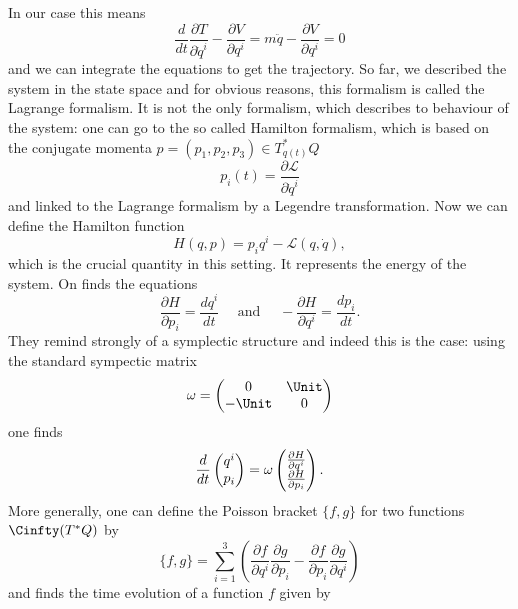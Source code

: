 In our case this means
\begin{equation*}
	\frac{d}{dt} 
	\frac{\partial T}{\partial \dot q^i}
	-
	\frac{\partial V}{\partial q^i}
	=
	m \ddot q
	-
	\frac{\partial V}{\partial q^i}
	=
	0
\end{equation*}
and we can integrate the equations to get the trajectory. So far, we described 
the system in the state space and for obvious reasons, this formalism is called 
the Lagrange formalism. It is not the only formalism, which describes to 
behaviour of the system: one can go to the so called Hamilton formalism, which 
is based on the conjugate momenta $p = (p_1, p_2, p_3) \in T_{q(t)}^*Q$
\begin{equation*}
	p_i(t)
	=
	\frac{\partial \mathcal{L}}{\partial \dot q^i}
\end{equation*}
and linked to the Lagrange formalism by a Legendre transformation. Now we can 
define the Hamilton function
\begin{equation*}
	H(q, p)
	=
	p_i q^i
	-
	\mathcal{L}(q, \dot q),
\end{equation*} 
which is the crucial quantity in this setting. It represents the energy of the 
system. On finds the equations
\begin{equation*}
	\frac{\partial H}{\partial p_i}
	=
	\frac{d q^i}{dt}
	\quad \text{ and } \quad
	- \frac{\partial H}{\partial q^i}
	=
	\frac{d p_i}{dt}.
\end{equation*}
They remind strongly of a symplectic structure and indeed this is the case: 
using the standard sympectic matrix
\begin{equation*}
	\omega
	=
	\begin{pmatrix}
		0 & \Unit
		\\
		- \Unit & 0
	\end{pmatrix}
\end{equation*}
one finds
\begin{equation*}
	\frac{d}{dt} \begin{pmatrix} q^i \\ p_i \end{pmatrix}
	=
	\omega
	\begin{pmatrix} \frac{\partial H}{\partial q^i} \\ \frac{\partial H}{\partial p_i} \end{pmatrix}.
\end{equation*}
More generally, one can define the Poisson bracket $\{f, g\}$ for two functions 
$\Cinfty(T^*Q)$ by
\begin{equation*}
	\{f, g\}
	=
	\sum\limits_{i=1}^3
	\left(
		\frac{\partial f}{\partial q^i}
		\frac{\partial g}{\partial p_i}
		-
		\frac{\partial f}{\partial p_i}
		\frac{\partial g}{\partial q^i}
	\right)
\end{equation*}
and finds the time evolution of a function $f$ given by
